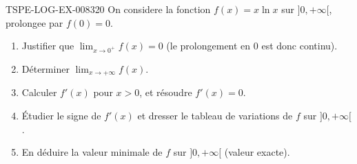 \begin{exercice}{TSPE-LOG-EX-008}{3}{20}
On considere la fonction $f(x) = x\ln x$ sur $]0, +\infty[$, prolongee par $f(0)=0$.
\begin{enumerate}
  \item Justifier que $\displaystyle\lim_{x \to 0^+} f(x) = 0$ (le prolongement en $0$ est donc continu).
  \item Déterminer $\displaystyle\lim_{x \to +\infty} f(x)$.
  \item Calculer $f'(x)$ pour $x>0$, et résoudre $f'(x)=0$.
  \item Étudier le signe de $f'(x)$ et dresser le tableau de variations de $f$ sur $]0,+\infty[$.
  \item En déduire la valeur minimale de $f$ sur $]0,+\infty[$ (valeur exacte).
\end{enumerate}
\end{exercice}
